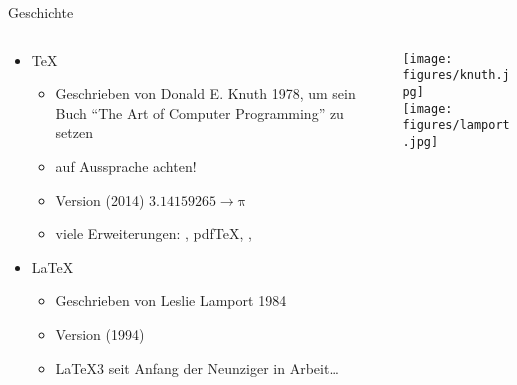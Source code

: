 \begin{frame}{Geschichte}
  \begin{columns}
    \begin{column}{0.75\textwidth}
      \begin{itemize}
        \item \TeX
          \begin{itemize}
            \addtolength{\itemsep}{0.5\baselineskip}
            \item Geschrieben von Donald E. Knuth 1978, um sein Buch \enquote{The Art of Computer Programming} zu setzen
            \item auf Aussprache achten!
            \item Version (2014) $3.14159265 → \mathup{π}$
            \item viele Erweiterungen: \eTeX, pdf\TeX, \XeTeX, \LuaTeX
          \end{itemize}
        \item \LaTeX
          \begin{itemize}
            \addtolength{\itemsep}{0.5\baselineskip}
            \item Geschrieben von Leslie Lamport 1984
            \item Version (1994) \LaTeXe
            \item \LaTeX3 seit Anfang der Neunziger in Arbeit…
          \end{itemize}
      \end{itemize}
    \end{column}
    \begin{column}{0.25\textwidth}
      \texttt{[image: figures/knuth.jpg]}\\
      \texttt{[image: figures/lamport.jpg]}
    \end{column}
  \end{columns}
\end{frame}

\begin{frame}
  \centering
\end{frame}

